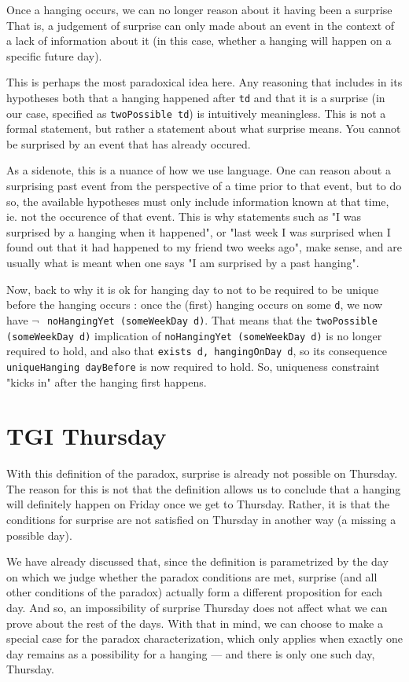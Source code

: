 \documentclass[journal]{journal}
\begin{document}
Once a hanging occurs, we can no longer reason about it having been a surprise
That is, a judgement of surprise can only made about
an event in the context of a lack of information about it (in this case,
whether a hanging will happen on a specific future day).

This is perhaps the most paradoxical idea here. Any reasoning that includes
in its hypotheses both that a hanging happened after {\tt td} and that it is a surprise
(in our case, specified as {\tt twoPossible td}) is intuitively meaningless. This is not a
formal statement, but rather a statement about what surprise means. You cannot
be surprised by an event that has already occured.

As a sidenote, this is a nuance of how we use language. One can reason about a surprising past
event from the perspective of a time prior to that event, but to do so,
the available hypotheses must only include information known at that time, ie.
not the occurence of that event. This is why statements such as "I was surprised
by a hanging when it happened", or "last week I was surprised when I found out
that it had happened to my friend two weeks ago", make sense, and are usually
what is meant when one says "I am surprised by a past hanging".

Now, back to why it is ok for hanging day to not to be required to be unique
before the hanging occurs : once the (first) hanging
occurs on some {\tt d}, we now have {\tt $\neg~$ noHangingYet (someWeekDay d)}.
That means that the {\tt twoPossible (someWeekDay d)} implication of {\tt noHangingYet (someWeekDay d)}
is no longer required to hold, and also that {\tt exists d, hangingOnDay d}, so
its consequence {\tt uniqueHanging dayBefore} is now required to hold.
So, uniqueness constraint "kicks in" after the hanging first happens.

\section{TGI Thursday}
\label{sec:tgit}

With this definition of the paradox, surprise is already not possible on Thursday.
The reason for this is not that the definition allows us to conclude that a hanging will
definitely happen on Friday once we get to Thursday. Rather, it is that the
conditions for surprise are not satisfied on Thursday in another way (a missing
a possible day).

We have already discussed that, since the definition
is parametrized by the day on which we judge whether the paradox conditions
are met, surprise (and all other conditions of the paradox) actually form
a different proposition for each day. And so, an impossibility of surprise
Thursday does not affect what we can prove about the rest of the days.
With that in mind, we can choose to make a special case
for the paradox characterization, which only applies when exactly one day remains as a possibility
for a hanging --- and there is only one such day, Thursday.
\end{document}
